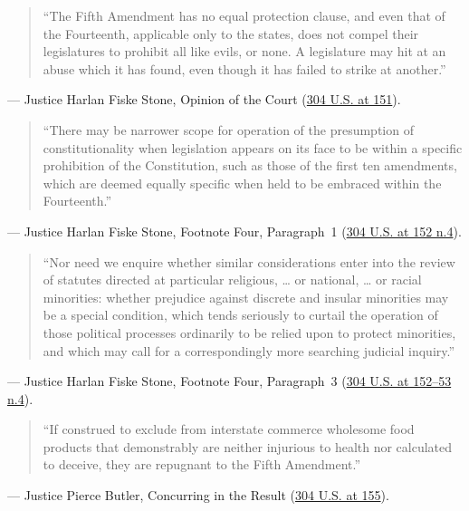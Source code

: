 \documentclass[12pt]{article}
\begin{document}
\begin{quote}
``The Fifth Amendment has no equal protection clause, and even that of the Fourteenth, applicable only to the states, does not compel their legislatures to prohibit all like evils, or none. A legislature may hit at an abuse which it has found, even though it has failed to strike at another.''
\end{quote}
\noindent --- Justice Harlan Fiske Stone, Opinion of the Court (\href{https://supreme.justia.com/cases/federal/us/304/144/}{304 U.S. at 151}).

\begin{quote}
``There may be narrower scope for operation of the presumption of constitutionality when legislation appears on its face to be within a specific prohibition of the Constitution, such as those of the first ten amendments, which are deemed equally specific when held to be embraced within the Fourteenth.''
\end{quote}
\noindent --- Justice Harlan Fiske Stone, Footnote Four, Paragraph~1 (\href{https://supreme.justia.com/cases/federal/us/304/144/}{304 U.S. at 152 n.4}).

\begin{quote}
``Nor need we enquire whether similar considerations enter into the review of statutes directed at particular religious, \dots{} or national, \dots{} or racial minorities: whether prejudice against discrete and insular minorities may be a special condition, which tends seriously to curtail the operation of those political processes ordinarily to be relied upon to protect minorities, and which may call for a correspondingly more searching judicial inquiry.''
\end{quote}
\noindent --- Justice Harlan Fiske Stone, Footnote Four, Paragraph~3 (\href{https://supreme.justia.com/cases/federal/us/304/144/}{304 U.S. at 152--53 n.4}).

\begin{quote}
``If construed to exclude from interstate commerce wholesome food products that demonstrably are neither injurious to health nor calculated to deceive, they are repugnant to the Fifth Amendment.''
\end{quote}
\noindent --- Justice Pierce Butler, Concurring in the Result (\href{https://supreme.justia.com/cases/federal/us/304/144/}{304 U.S. at 155}).
\end{document}
